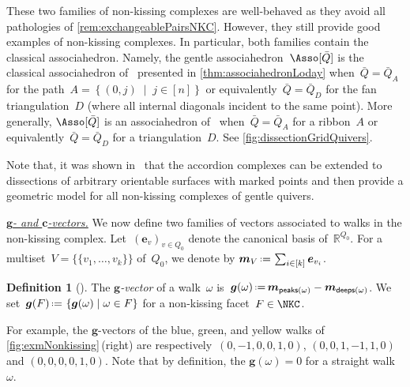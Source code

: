 \documentclass{amsart}
\theoremstyle{definition}
\newtheorem{definition}[theorem]{Definition}
\newcommand{\R}{\mathbb{R}} %
\renewcommand{\b}[1]{{\boldsymbol{#1}}} %
\newcommand{\set}[2]{\left\{ #1 \;\middle|\; #2 \right\}} %
\newcommand{\eqdef}{\mbox{\,\raisebox{0.2ex}{\scriptsize\ensuremath{\mathrm:}}\ensuremath{=}\,}} %
\newcommand{\darkblue}{\color{darkblue}} %
\newcommand{\defn}[1]{\textsl{\darkblue #1}} %
\newcommand{\para}[1]{\medskip\noindent\uline{\textit{#1.}}} %
\newcommand{\multiplicityVector}{\b{m}} %
\newcommand{\gvector}[1]{\b{g}(#1)} %
\newcommand{\gvectors}[1]{\b{g}(#1)} %
\newcommand{\quiver}{\bar Q} %
\newcommand{\peaks}[1]{\mathsf{peaks}(#1)} %
\newcommand{\deeps}[1]{\mathsf{deeps}(#1)} %
\begin{document}
These two families of non-kissing complexes are well-behaved as they avoid all pathologies of \cref{rem:exchangeablePairsNKC}.
However, they still provide good examples of non-kissing complexes.
In particular, both families contain the classical associahedron.
Namely, the gentle associahedron~$\Asso[\quiver]$ is the classical associahedron of~\cite{ShniderSternberg, Loday} presented in \cref{thm:associahedronLoday} when~${\quiver = \quiver_A}$ for the path~${A = \set{(0,j)}{j \in [n]}}$ or equivalently~$\quiver = \quiver_D$ for the fan triangulation~$D$ (where all internal diagonals incident to the same point).
More generally, $\Asso[\quiver]$ is an associahedron of~\cite{HohlwegLange} when~$\quiver = \quiver_A$ for a ribbon~$A$ or equivalently~$\quiver = \quiver_D$ for a triangulation~$D$.
See \cref{fig:dissectionGridQuivers}.

Note that, it was shown in~\cite{PaluPilaudPlamondon-surfaces} that the accordion complexes can be extended to dissections of arbitrary orientable surfaces with marked points and then provide a geometric model for all non-kissing complexes of gentle quivers.

\para{$\b{g}$- and $\b{c}$-vectors}
%
We now define two families of vectors associated to walks in the non-kissing complex.
Let~$(\b{e}_v)_{v \in Q_0}$ denote the canonical basis of~$\R^{Q_0}$.
For a multiset~$V = \{\!\{v_1, \dots, v_k\}\!\}$ of~$Q_0$, we denote by $\multiplicityVector_V \eqdef \sum_{i \in [k]} \b{e}_{v_i}$.

\begin{definition}[{\cite[Def.~{4.8}]{PaluPilaudPlamondon-nonkissing}}]
The \defn{$\b{g}$-vector} of a walk~$\omega$ is~$\gvector{\omega} \eqdef \multiplicityVector_{\peaks{\omega}} - \multiplicityVector_{\deeps{\omega}}$.
We set~$\gvectors{F} \eqdef \set{\gvector{\omega}}{\omega \in F}$ for a non-kissing facet~$F \in \NKC$.
\end{definition}

For example, the $\b{g}$-vectors of the blue, green, and yellow walks of \cref{fig:exmNonkissing}\,(right) are respectively~$(0, -1, 0, 0, 1, 0)$, $(0, 0, 1, -1, 1, 0)$ and $(0, 0, 0, 0, 1, 0)$.
Note that by definition, the $\gvector{\omega} = 0$ for a straight walk~$\omega$.
\end{document}

